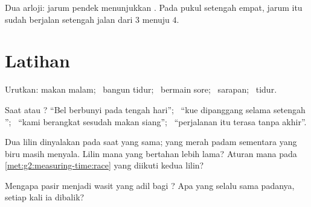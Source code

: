 \begin{omfigure}

{\small Dua arloji: jarum pendek menunjukkan . Pada pukul
setengah empat, jarum itu sudah berjalan setengah jalan dari $3$
menuju $4$.}
\end{omfigure}

\section{Latihan}

\begin{exercise}[$\star$]\label{exo:g2:measuring-time:1}
Urutkan: makan malam; \ bangun tidur; \ bermain sore; \ sarapan;
\ tidur.
\end{exercise}

\begin{exercise}[$\star$]\label{exo:g2:measuring-time:2}
Saat atau ? ``Bel berbunyi pada tengah hari''; \ ``kue
dipanggang selama setengah ''; \ ``kami berangkat sesudah makan
siang''; \ ``perjalanan itu terasa tanpa akhir''.
\end{exercise}

\begin{exercise}[$\star$]\label{exo:g2:measuring-time:3}
Dua lilin dinyalakan pada saat yang sama; yang merah padam sementara
yang biru masih menyala. Lilin mana yang bertahan lebih lama? Aturan
mana pada \cref{met:g2:measuring-time:race} yang diikuti kedua lilin?
\end{exercise}

\begin{exercise}[$\star$]\label{exo:g2:measuring-time:4}
Mengapa  pasir menjadi wasit yang adil bagi ? Apa yang
selalu sama padanya, setiap kali ia dibalik?
\end{exercise}

